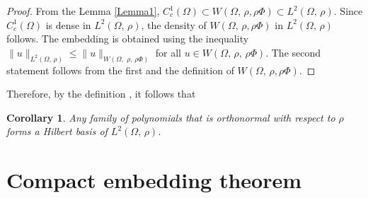 \documentclass[11pt]{article}
\newtheorem{corollary}[theorem]{Corollary}
\begin{document}
	\begin{proof}
		From the Lemma \ref{Lemma1}, $C_c^1(\Omega)\subset W(\Omega,\, \rho,\rho\Phi)\subset L^2(\Omega,\, \rho)$. Since $C_c^1(\Omega)$ is dense in $L^2(\Omega,\,  \rho)$, the density of $W(\Omega,\, \rho,\rho\Phi)$ in $L^2(\Omega,\, \rho)$ follows. The embedding is obtained using the inequality $\|u\|_{L^2(\Omega,\,\rho)}\leq \|u\|_{W(\Omega,\, \,\rho,\,\rho\Phi)}$ for all $u\in W(\Omega,\,\rho,\,\rho\Phi)$. The second statement follows from the first and the definition of $W(\Omega,\,  \rho,\rho\Phi)$.
	\end{proof} 
	Therefore, by the definition \cite[p.143]{HB2011}, it follows that
	\begin{corollary} Any family of polynomials that is orthonormal with respect to $\rho$ forms a Hilbert basis of $L^2(\Omega,\,\rho)$.
	\end{corollary}
	
	\section{Compact embedding theorem}
\end{document}
